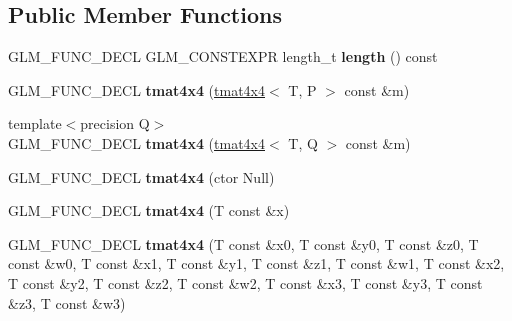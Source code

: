 \subsection*{Public Member Functions}
\begin{DoxyCompactItemize}
\item 
G\+L\+M\+\_\+\+F\+U\+N\+C\+\_\+\+D\+E\+CL G\+L\+M\+\_\+\+C\+O\+N\+S\+T\+E\+X\+PR length\+\_\+t {\bfseries length} () const \hypertarget{structglm_1_1detail_1_1tmat4x4_af3a5d6805357ba6b87e100995fbbd338}{}\label{structglm_1_1detail_1_1tmat4x4_af3a5d6805357ba6b87e100995fbbd338}

\item 
G\+L\+M\+\_\+\+F\+U\+N\+C\+\_\+\+D\+E\+CL {\bfseries tmat4x4} (\hyperlink{structglm_1_1detail_1_1tmat4x4}{tmat4x4}$<$ T, P $>$ const \&m)\hypertarget{structglm_1_1detail_1_1tmat4x4_a10821dfc2a11592b00c0504964af9a30}{}\label{structglm_1_1detail_1_1tmat4x4_a10821dfc2a11592b00c0504964af9a30}

\item 
{\footnotesize template$<$precision Q$>$ }\\G\+L\+M\+\_\+\+F\+U\+N\+C\+\_\+\+D\+E\+CL {\bfseries tmat4x4} (\hyperlink{structglm_1_1detail_1_1tmat4x4}{tmat4x4}$<$ T, Q $>$ const \&m)\hypertarget{structglm_1_1detail_1_1tmat4x4_ad5f2b14d5f60c0b2b27ab28f7df8477b}{}\label{structglm_1_1detail_1_1tmat4x4_ad5f2b14d5f60c0b2b27ab28f7df8477b}

\item 
G\+L\+M\+\_\+\+F\+U\+N\+C\+\_\+\+D\+E\+CL {\bfseries tmat4x4} (ctor Null)\hypertarget{structglm_1_1detail_1_1tmat4x4_af4e9ff77d235161a72c835f8609dd8e7}{}\label{structglm_1_1detail_1_1tmat4x4_af4e9ff77d235161a72c835f8609dd8e7}

\item 
G\+L\+M\+\_\+\+F\+U\+N\+C\+\_\+\+D\+E\+CL {\bfseries tmat4x4} (T const \&x)\hypertarget{structglm_1_1detail_1_1tmat4x4_a265d71ebfc8a91f1b8d9104933799f49}{}\label{structglm_1_1detail_1_1tmat4x4_a265d71ebfc8a91f1b8d9104933799f49}

\item 
G\+L\+M\+\_\+\+F\+U\+N\+C\+\_\+\+D\+E\+CL {\bfseries tmat4x4} (T const \&x0, T const \&y0, T const \&z0, T const \&w0, T const \&x1, T const \&y1, T const \&z1, T const \&w1, T const \&x2, T const \&y2, T const \&z2, T const \&w2, T const \&x3, T const \&y3, T const \&z3, T const \&w3)\hypertarget{structglm_1_1detail_1_1tmat4x4_a4d793b3d9f54148c86334948d7eef97a}{}\label{structglm_1_1detail_1_1tmat4x4_a4d793b3d9f54148c86334948d7eef97a}


\end{DoxyCompactItemize}
